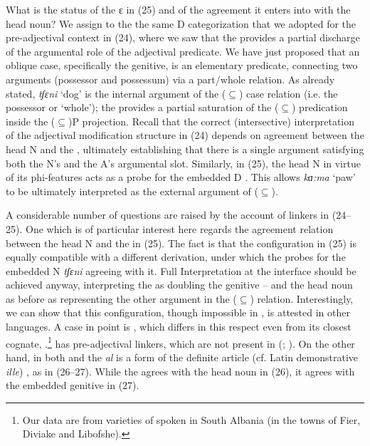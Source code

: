 \documentclass[output=paper]{langsci/langscibook}
\begin{document}
What is the status of the  ɛ in (25) and of the agreement it enters into with the head noun? We assign to the  the same D categorization that we adopted for the pre-ad\-jec\-ti\-val context in (24), where we saw that the  provides a partial discharge of the argumental role of the adjectival predicate. We have just proposed that an oblique case, specifically the genitive, is an elementary predicate, connecting two arguments (possessor and possessum) via a part\slash whole relation. As already stated, \textit{tʃɛni} ‘dog’ is the internal argument of the ($\subseteq$) case relation (i.e. the possessor or ‘whole’); the  provides a partial saturation of the ($\subseteq$) predication inside the ($\subseteq$)P projection. Recall that the correct (intersective) interpretation of the adjectival modification structure in (24) depends on agreement between the head N and the , ultimately establishing that there is a single argument satisfying both the N’s and the A’s argumental slot. Similarly, in (25), the head N in virtue of its phi-features acts as a probe for the embedded D . This allows \textit{kɑ:ma} ‘paw’ to be ultimately interpreted as the external argument of ($\subseteq$).

A considerable number of questions are raised by the account of linkers in (24--25). One which is of particular interest here regards the agreement relation between the head N and the  in (25). The fact is that the configuration in (25) is equally compatible with a different derivation, under which the  probes for the embedded N \textit{tʃɛni} agreeing with it. Full Interpretation at the interface should be achieved anyway, interpreting the  as doubling the genitive – and the head noun as before as representing the other argument in the ($\subseteq$) relation. Interestingly, we can show that this configuration, though impossible in , is attested in other languages. A case in point is , which differs in this respect even from its closest cognate, .\footnote{Our data are from varieties of  spoken in South Albania (in the towns of Fier, Diviake and Libofshe).}  has pre-ad\-jec\-ti\-val linkers, which are not present in  (\citealt{Campos2008}; \citealt{Cornilescu2013}). On the other hand, in both  and  the  \textit{al} is a form of the definite article (cf. Latin demonstrative \textit{ille}) \citep{Giurgea2012}, as in (26--27). While the  agrees with the head noun in  (26), it agrees with the embedded genitive in  (27).
\end{document}
